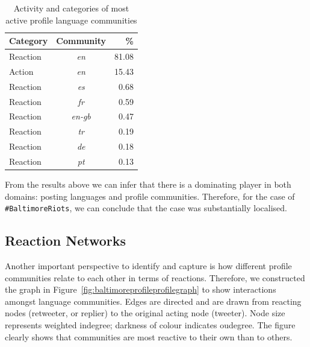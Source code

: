\begin{table}[!htb]
\centering
\begin{tabular}{@{}lcr@{}}
\toprule
\textbf{Category} & \textbf{Community} & \textbf{\%} \\ \midrule
Reaction & {\emph{en}} & 81.08 \\
Action & {\emph{en}} & 15.43 \\
Reaction & {\emph{es}} & 0.68 \\
Reaction & {\emph{fr}} & 0.59 \\
Reaction & {\emph{en-gb}} & 0.47 \\
Reaction & {\emph{tr}} & 0.19 \\
Reaction & {\emph{de}} & 0.18 \\
Reaction & {\emph{pt}} & 0.13 \\ \bottomrule
\end{tabular}
\caption{Activity and categories of most active profile language
  communities}
\label{tbl:mostactive}
\end{table}

From the results above we can infer that there is a dominating player
in both domains: posting languages and profile communities. Therefore,
for the case of {\texttt{\#BaltimoreRiots}}, we can conclude that the case was
substantially localised.


\subsection{Reaction Networks}\label{reactionnetworks}

Another important perspective to identify and capture is how different
profile communities relate to each other in terms of
reactions. Therefore, we constructed the graph in
Figure~\ref{fig:baltimoreprofileprofilegraph} to show interactions amongst
language communities. Edges are directed and are drawn from reacting
nodes (retweeter, or replier) to the original acting node
(tweeter). Node size represents weighted indegree; darkness of colour indicates oudegree. The figure clearly shows that communities 
are most reactive to their own than to others.

